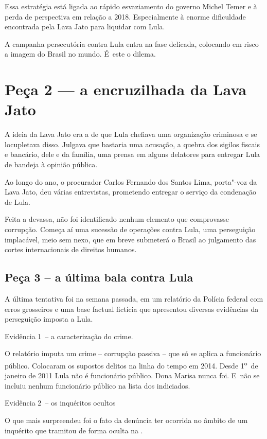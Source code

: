 Essa estratégia está ligada ao rápido esvaziamento do governo Michel
Temer e à perda de perspectiva em relação a 2018. Especialmente à enorme
dificuldade encontrada pela Lava Jato para liquidar com Lula.

A campanha persecutória contra Lula entra na fase delicada, colocando em
risco a imagem do Brasil no mundo. É~este o dilema.~~~~~~~~~~~

\section{Peça 2 --- a encruzilhada da Lava Jato}

A ideia da Lava Jato era a de que Lula chefiava uma organização
criminosa e se locupletava disso. Julgava que bastaria uma acusação, a
quebra dos sigilos fiscais e bancário, dele e da família, uma prensa em
alguns delatores para entregar Lula de bandeja à opinião pública.

Ao longo do ano, o procurador Carlos Fernando dos Santos Lima, porta"-voz
da Lava Jato, deu várias entrevistas, prometendo entregar o serviço da
condenação de Lula.

Feita a devassa, não foi identificado nenhum elemento que comprovasse
corrupção. Começa aí uma sucessão de operações contra Lula, uma
perseguição implacável, meio sem nexo, que em breve submeterá o Brasil
ao julgamento das cortes internacionais de direitos humanos.

\subsection{Peça 3 -- a última bala contra Lula}

A última tentativa foi na semana passada, em um relatório da Polícia
federal com erros grosseiros e uma base factual fictícia que apresentou
diversas evidências da perseguição imposta a Lula.

Evidência 1~-- a caracterização do crime.

O relatório imputa um crime -- corrupção passiva -- que só se aplica a
funcionário público. Colocaram os supostos delitos na linha do tempo em
2014. Desde 1\textsuperscript{o}~de janeiro de 2011 Lula não é
funcionário público. Dona Marisa nunca foi. E~não se incluiu nenhum
funcionário público na lista dos indiciados.

Evidência 2~-- os inquéritos ocultos

O que mais surpreendeu foi o fato da denúncia ter ocorrida no âmbito de
um inquérito que tramitou de forma oculta na .~

